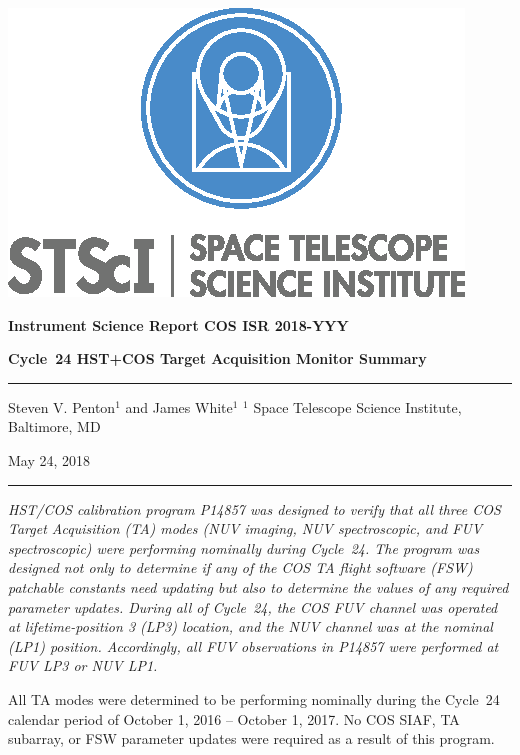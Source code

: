 \documentclass[12pt]{reportj}
\newcommand{\pid}[1]{{\rm P}#1}
\newcommand{\thisISR}[1]{COS ISR 2018-YYY}
\begin{document}
\vspace{-2.5cm}
\noindent\includegraphics*[width=0.295\linewidth]{new_st_logo.eps}

\vspace{-0.5cm}

\begin{flushright}
{\bf Instrument Science Report \thisISR{}}

\vspace{1.0cm}
{\bf\Huge Cycle~24 HST+COS Target Acquisition Monitor Summary}

\rule{0.25\linewidth}{0.5pt}

\vspace{0.4cm}
Steven V. Penton$^1$ and James White$^1$
\linebreak
\newline
\footnotesize{$^1$ Space Telescope Science Institute, Baltimore, MD}
\vspace{0.5cm}

May 24, 2018
\end{flushright}
\vspace{-0.3cm}
\noindent\rule{\linewidth}{1.0pt}

{\it \noindent
HST/COS calibration program \pid{14857} was designed to verify that all three COS Target Acquisition (TA) modes (NUV imaging, NUV spectroscopic, and FUV spectroscopic)
 were performing nominally during Cycle~24. The program was designed not only to determine if any of the COS TA flight software (FSW) patchable constants need updating but also to determine the values of any required parameter updates.
During all of Cycle~24, the COS FUV channel was operated at lifetime-position 3 (LP3) location, and the NUV channel was at the nominal (LP1) position. Accordingly, all FUV observations in \pid{14857} were performed at FUV LP3 or NUV LP1.

All TA modes were determined to be performing nominally during the Cycle~24 calendar period of October 1, 2016 -- October 1, 2017. No COS SIAF, TA subarray, or FSW parameter updates were required as a result of this program. }
\end{document}
